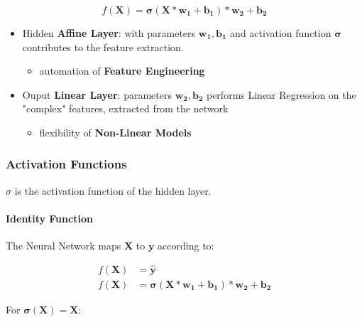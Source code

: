 \documentclass[11pt]{article}
\providecommand{\tightlist}{%
      \setlength{\itemsep}{0pt}\setlength{\parskip}{0pt}}
\begin{document}
    

    \begin{equation}
    f(\mathbf{X}) = \boldsymbol{\sigma(\mathbf{X}*\mathbf{w_{1}} + \mathbf{b_{1}})*\mathbf{w_{2}} + \mathbf{b_{2}}}
\end{equation}

    \begin{itemize}
\tightlist
\item
  Hidden \textbf{Affine Layer}: with parameters
  \(\mathbf{w_{1}}, \mathbf{b_{1}}\) and activation function
  \(\boldsymbol{\sigma}\) contributes to the feature extraction.

  \begin{itemize}
  \tightlist
  \item
    automation of \textbf{Feature Engineering}
  \end{itemize}
\item
  Ouput \textbf{Linear Layer}: parameters
  \(\mathbf{w_{2}}, \mathbf{b_{2}}\) performs Linear Regression on the
  "complex" features, extracted from the network

  \begin{itemize}
  \tightlist
  \item
    flexibility of \textbf{Non-Linear Models}
  \end{itemize}
\end{itemize}

    \subsubsection{Activation Functions }\label{activation-functions}

    \(\sigma\) is the activation function of the hidden layer.

    \paragraph{Identity Function}\label{identity-function}

The Neural Network maps \(\mathbf{X}\) to \(\mathbf{y}\) according to:

\begin{align}
    f(\mathbf{X}) &= \mathbf{\hat{y}}\\
    f(\mathbf{X}) &= \boldsymbol{\sigma(\mathbf{X}*\mathbf{w_{1}} + \mathbf{b_{1}})*\mathbf{w_{2}} + \mathbf{b_{2}}}  
\end{align}

For \(\boldsymbol{\sigma(X)} = \mathbf{X}\):
\end{document}

